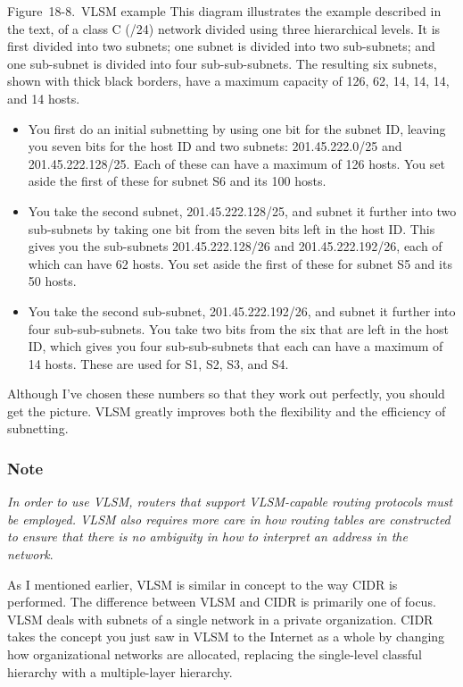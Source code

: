 
Figure~18-8.~VLSM example This diagram illustrates the example described
in the text, of a class C (/24) network divided using three hierarchical
levels. It is first divided into two subnets; one subnet is divided into
two sub-subnets; and one sub-subnet is divided into four
sub-sub-subnets. The resulting six subnets, shown with thick black
borders, have a maximum capacity of 126, 62, 14, 14, 14, and 14 hosts.

\begin{itemize}
\item
  You first do an initial subnetting by using one bit for the subnet ID,
  leaving you seven bits for the host ID and two subnets:
  201.45.222.0/25 and 201.45.222.128/25. Each of these can have a
  maximum of 126 hosts. You set aside the first of these for subnet S6
  and its 100 hosts.
\item
  You take the second subnet, 201.45.222.128/25, and subnet it further
  into two sub-subnets by taking one bit from the seven bits left in the
  host ID. This gives you the sub-subnets 201.45.222.128/26 and
  201.45.222.192/26, each of which can have 62 hosts. You set aside the
  first of these for subnet S5 and its 50 hosts.
\item
  You take the second sub-subnet, 201.45.222.192/26, and subnet it
  further into four sub-sub-subnets. You take two bits from the six that
  are left in the host ID, which gives you four sub-sub-subnets that
  each can have a maximum of 14 hosts. These are used for S1, S2, S3,
  and S4.
\end{itemize}

Although I've chosen these numbers so that they work out perfectly, you
should get the picture. VLSM greatly improves both the flexibility and
the efficiency of subnetting.

\subsubsection[Note]{\texorpdfstring{Note}{Note}}

{\emph{In order to use VLSM, routers that support VLSM-capable routing
protocols must be employed. VLSM also requires more care in how routing
tables are constructed to ensure that there is no ambiguity in how to
interpret an address in the
network}}.

As I mentioned earlier, VLSM is similar in concept to the way CIDR is
performed. The difference between VLSM and CIDR is primarily one of
focus. VLSM deals with subnets of a single network in a private
organization. CIDR takes the concept you just saw in VLSM to the
Internet as a whole by changing how organizational networks are
allocated, replacing the single-level classful hierarchy with a
multiple-layer hierarchy.





